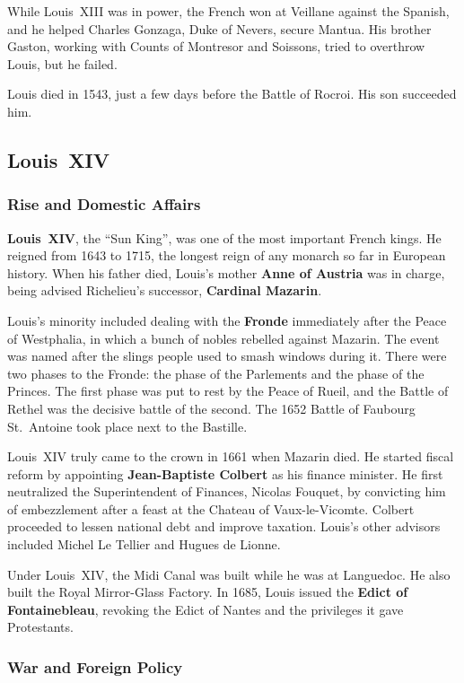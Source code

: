 While Louis~XIII was in power, the French won at Veillane against the Spanish,
and he helped Charles Gonzaga, Duke of Nevers, secure Mantua.
His brother Gaston, working with Counts of Montresor and Soissons,
tried to overthrow Louis, but he failed.

Louis died in 1543, just a few days before the Battle of Rocroi.
His son succeeded him.

\subsection*{Louis~XIV}

\subsubsection*{Rise and Domestic Affairs}

\textbf{Louis~XIV}, the ``Sun King'', was one of the most important French kings.
He reigned from 1643 to 1715, the longest reign of any monarch so far in European history.
When his father died,
Louis's mother \textbf{Anne of Austria} was in charge, being advised Richelieu's successor,
\textbf{Cardinal Mazarin}.

Louis's minority included dealing with the \textbf{Fronde}
immediately after the Peace of Westphalia,
in which a bunch of nobles rebelled against Mazarin.
The event was named after the slings people used to smash windows during it.
There were two phases to the Fronde: the phase of the Parlements and the phase of the Princes.
The first phase was put to rest by the Peace of Rueil,
and the Battle of Rethel was the decisive battle of the second.
The 1652 Battle of Faubourg St.\ Antoine took place next to the Bastille.

Louis~XIV truly came to the crown in 1661 when Mazarin died.
He started fiscal reform by appointing \textbf{Jean-Baptiste Colbert} as his finance minister.
He first neutralized the Superintendent of Finances, Nicolas Fouquet,
by convicting him of embezzlement after a feast at the Chateau of Vaux-le-Vicomte.
Colbert proceeded to lessen national debt and improve taxation.
Louis's other advisors included Michel Le Tellier and Hugues de Lionne.

Under Louis~XIV, the Midi Canal was built while he was at Languedoc.
He also built the Royal Mirror-Glass Factory.
In 1685, Louis issued the \textbf{Edict of Fontainebleau},
revoking the Edict of Nantes and the privileges it gave Protestants.

\subsubsection*{War and Foreign Policy}


